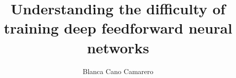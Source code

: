 \title{Understanding the difficulty of training deep feedforward neural networks}
\author{Blanca Cano Camarero}


\relax
{}\relax
{}\relax

\newcommand{\bgcolor}{blue}